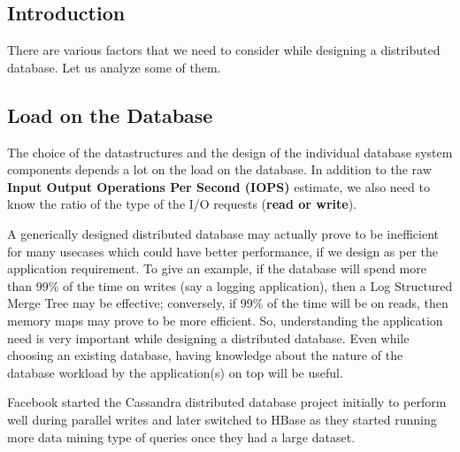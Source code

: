 \subsection{Introduction}

There are various factors that we need to consider while designing a distributed database. Let us analyze some of them.

\subsection{Load on the Database}

The choice of the datastructures and the design of the individual database system components depends a lot on the load on the database. In addition to the raw \textbf{Input Output Operations Per Second (IOPS)} estimate, we also need to know the ratio of the type of the I/O requests (\textbf{read or write}). 

A generically designed distributed database may actually prove to be inefficient for many usecases which could have better performance, if we design as per the application requirement. To give an example, if the database will spend more than 99\% of the time on writes (say a logging application), then a Log Structured Merge Tree may be effective; conversely, if 99\% of the time will be on reads, then memory maps may prove to be more efficient. So, understanding the application need is very important while designing a distributed database. Even while choosing an existing database, having knowledge about the nature of the database workload by the application(s) on top will be useful.

Facebook started the Cassandra distributed database project initially to perform well during parallel writes and later switched to HBase as they started running more data mining type of queries once they had a large dataset.